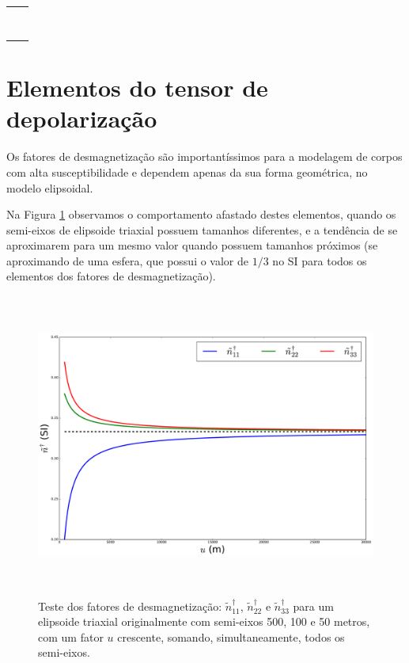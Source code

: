 \begin{table}[h!]
	\begin{center}
		\begin{tabular}{lc}
			
			&  \\
			& \\
			& \\
			& \\
			& \\
			& \\ 
			& \\
			& \\
		\end{tabular}
	\end{center}
\end{table}

\section{Elementos do tensor de depolarização}

Os fatores de desmagnetização são importantíssimos para a modelagem de corpos com alta susceptibilidade e dependem apenas da sua forma geométrica, no modelo elipsoidal. 

Na Figura \ref{fig:n_triaxial} observamos o comportamento afastado destes elementos, quando os semi-eixos de elipsoide triaxial possuem tamanhos diferentes, e a tendência de se aproximarem para um mesmo valor quando possuem tamanhos próximos (se aproximando de uma esfera, que possui o valor de $1/3$ no SI para todos os elementos dos fatores de desmagnetização).


\begin{figure}[hbt!]
	\centering \includegraphics[width=15cm,height=10cm]{figures/test_n_triaxial}
	\caption[Teste dos fatores de desmagnetização para um elipsoide triaxial.]{Teste dos fatores de desmagnetização:
		$\tilde{n}^{\dagger}_{11}$, $\tilde{n}^{\dagger}_{22}$ e $\tilde{n}^{\dagger}_{33}$ 
		para um elipsoide triaxial originalmente com semi-eixos 500, 100 e 50 metros, com um fator $u$ crescente,
		somando, simultaneamente, todos os semi-eixos.}
	\label{fig:n_triaxial}
\end{figure}

